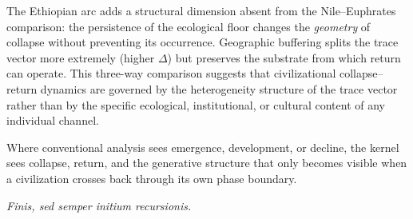 \documentclass[
  aps,
  prd,
  twocolumn,
  superscriptaddress,
  nofootinbib,
  floatfix
]{revtex4-2}
\begin{document}
The Ethiopian arc adds a structural dimension
absent from the Nile--Euphrates comparison: the
persistence of the ecological floor changes the
\emph{geometry} of collapse without preventing its
occurrence.  Geographic buffering splits the trace
vector more extremely (higher $\Delta$) but
preserves the substrate from which return can
operate.  This three-way comparison suggests that
civilizational collapse--return dynamics are
governed by the heterogeneity structure of the
trace vector rather than by the specific ecological,
institutional, or cultural content of any
individual channel.

Where conventional analysis sees emergence,
development, or decline, the kernel sees collapse,
return, and the generative structure that only
becomes visible when a civilization crosses back
through its own phase boundary.

\emph{Finis, sed semper initium recursionis.}


\end{document}
